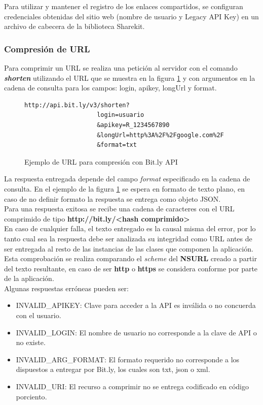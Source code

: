 Para utilizar y mantener el registro de los enlaces compartidos, se configuran credenciales obtenidas del sitio web \cite{bitly-settings} (nombre de usuario y Legacy API Key) en un archivo de cabecera de la biblioteca Sharekit.


		
		\subsubsection{Compresión de URL}
Para comprimir un URL se realiza una petición al servidor con el comando \textit{\textbf{shorten}} utilizando el URL que se muestra en la figura \ref{bitly-shorten} y con argumentos en la cadena de consulta para los campos: login, apikey, longUrl y format.

\begin{figure}[H]
	\centering
\begin{lstlisting}
http://api.bit.ly/v3/shorten?
					login=usuario
					&apikey=R_1234567890
					&longUrl=http%3A%2F%2Fgoogle.com%2F
					&format=txt
\end{lstlisting}
	\caption{Ejemplo de URL para compresión con Bit.ly API}
	\label{bitly-shorten}
\end{figure}	

La respuesta entregada depende del campo \textit{format} especificado en la cadena de consulta. En el ejemplo de la figura \ref{bitly-shorten} se espera en formato de texto plano, en caso de no definir formato la respuesta se entrega como objeto JSON.\\

Para una respuesta exitosa se recibe una cadena de caracteres con el URL comprimido de tipo 
\textbf{http://bit.ly/\textless hash comprimido\textgreater} \\

En caso de cualquier falla, el texto entregado es la causal misma del error, por lo tanto cual sea la respuesta debe ser analizada su integridad como URL antes de ser entregada al resto de las instancias de las clases que componen la aplicación. Esta comprobación se realiza comparando el \textit{scheme} del \textbf{NSURL} creado a partir del texto resultante, en caso de ser \textbf{http} o \textbf{https} se considera conforme por parte de la aplicación.\\ 

Algunas respuestas erróneas pueden ser:
\begin{itemize}
\item INVALID\_APIKEY: Clave para acceder a la API es inválida o no concuerda con el usuario. 
\item INVALID\_LOGIN: El nombre de usuario no corresponde a la clave de API o no existe.
\item INVALID\_ARG\_FORMAT: El formato requerido no corresponde a los dispuestos a entregar por Bit.ly, los cuales son txt, json o xml.
\item INVALID\_URI: El recurso a comprimir no se entrega codificado en código porciento\cite{percent-encoding}.
\end{itemize}

